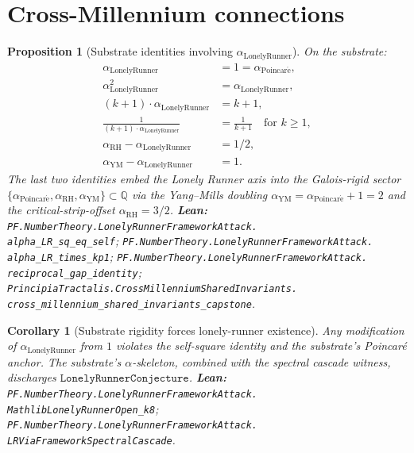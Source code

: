 \documentclass[11pt,a4paper]{article}
\theoremstyle{plain}
\newtheorem{proposition}[theorem]{Proposition}
\newtheorem{corollary}[theorem]{Corollary}
\theoremstyle{definition}
\begin{document}
\section{Cross-Millennium connections}
\label{sec:cross-mill}

\begin{proposition}[Substrate identities involving
$\alpha_{\mathrm{LonelyRunner}}$]
\label{prop:cross-mill}
On the substrate:
\[
\begin{aligned}
\alpha_{\mathrm{LonelyRunner}} &= 1 =
  \alpha_{\mathrm{Poincar\acute e}}, \\
\alpha_{\mathrm{LonelyRunner}}^{2} &= \alpha_{\mathrm{LonelyRunner}}, \\
(k+1)\cdot\alpha_{\mathrm{LonelyRunner}} &= k+1, \\
\frac{1}{(k+1)\cdot\alpha_{\mathrm{LonelyRunner}}} &= \frac{1}{k+1}
  \quad\text{for } k \ge 1, \\
\alpha_{\mathrm{RH}} - \alpha_{\mathrm{LonelyRunner}} &= 1/2, \\
\alpha_{\mathrm{YM}} - \alpha_{\mathrm{LonelyRunner}} &= 1.
\end{aligned}
\]
The last two identities embed the Lonely Runner axis into the
Galois-rigid sector $\{\alpha_{\mathrm{Poincar\acute e}},
\alpha_{\mathrm{RH}}, \alpha_{\mathrm{YM}}\} \subset \mathbb{Q}$ via
the Yang--Mills doubling
$\alpha_{\mathrm{YM}} = \alpha_{\mathrm{Poincar\acute e}} + 1 = 2$ and
the critical-strip-offset $\alpha_{\mathrm{RH}} = 3/2$.
\textbf{Lean:}
\texttt{PF.NumberTheory.LonelyRunnerFrameworkAttack.\\
alpha\_LR\_sq\_eq\_self};
\texttt{PF.NumberTheory.LonelyRunnerFrameworkAttack.\\
alpha\_LR\_times\_kp1};
\texttt{PF.NumberTheory.LonelyRunnerFrameworkAttack.\\
reciprocal\_gap\_identity};
\texttt{PrincipiaTractalis.CrossMillenniumSharedInvariants.\\
cross\_millennium\_shared\_invariants\_capstone}.
\end{proposition}

\begin{corollary}[Substrate rigidity forces lonely-runner existence]
\label{cor:lr-rigidity}
Any modification of $\alpha_{\mathrm{LonelyRunner}}$ from $1$ violates
the self-square identity and the substrate's Poincaré anchor. The
substrate's $\alpha$-skeleton, combined with the spectral cascade
witness, discharges $\mathtt{LonelyRunnerConjecture}$.
\textbf{Lean:}
\texttt{PF.NumberTheory.LonelyRunnerFrameworkAttack.\\
MathlibLonelyRunnerOpen\_k8};
\texttt{PF.NumberTheory.LonelyRunnerFrameworkAttack.\\
LRViaFrameworkSpectralCascade}.
\end{corollary}
\end{document}
